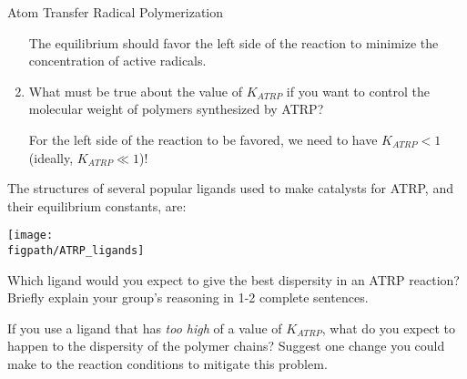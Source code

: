 \begin{activity}{Atom Transfer Radical Polymerization}
\begin{ctqs}
\begin{enumerate}
				\begin{solution}[0.9in]
				
					The equilibrium should favor the left side of the reaction to minimize the concentration of active radicals.
				
				\end{solution}
			
			\item What must be true about the value of $K_{ATRP}$ if you want to control the molecular weight of polymers synthesized by ATRP?
			
				\begin{solution}[0.9in]
				
					For the left side of the reaction to be favored,  we need to have $K_{ATRP}< 1$ (ideally, $K_{ATRP}\ll 1$)!
				
				\end{solution}
			
		\end{enumerate}

\end{ctqs}

\begin{infobox}
	The structures of several popular ligands used to make catalysts for ATRP, and their equilibrium constants, are:
	
	\centerline{\texttt{[image: \\figpath/ATRP\_ligands]}}
\end{infobox}

\begin{ctqs}
	
	\question Which ligand would you expect to give the best dispersity in an ATRP reaction?  Briefly explain your group's reasoning in 1-2 complete sentences.
	
		\begin{solution}[1.25in]
		\studentdisplay{}
		\end{solution}
	
	\question If you use a ligand that has \emph{too high} of a value of $K_{ATRP}$, what do you expect to happen to the dispersity of the polymer chains?  Suggest one change you could make to the reaction conditions to mitigate this problem.
	

\end{ctqs}
\end{activity}
